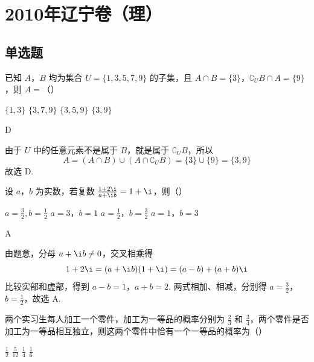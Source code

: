 \chapter{2010年辽宁卷（理）}

\section{单选题}

\begin{problem}
已知 \(A\)，\(B\) 均为集合 \(U = \{1, 3, 5, 7, 9\}\) 的子集，且 \(A \cap B = \{3\}\)，\(\complement_U B \cap A = \{9\}\)，则 \(A =\)（\quad）

\choices
    {\(\{1, 3\}\)}
    {\(\{3,7,9\}\)}
    {\(\{3,5,9\}\)}
    {\(\{3,9\}\)}
\end{problem}

\begin{answer}
D
\end{answer}

\begin{solution}
由于 \(U\) 中的任意元素不是属于 \(B\)，就是属于 \(\complement_U B\)，所以
\[
A=(A\cap B)\cup(A\cap\complement_U B)=\{3\}\cup\{9\}=\{3,9\}
\]
故选 D.
\end{solution}

\begin{problem}
设 \(a\)，\(b\) 为实数，若复数 \(\frac{1 + 2\i}{a + \i b} = 1 + \i\)，则（\quad）

\choices
    {\(a = \frac{3}{2}, b = \frac{1}{2}\)}
    {\(a = 3\)，\(b = 1\)}
    {\(a = \frac{1}{2}\)，\(b = \frac{3}{2}\)}
    {\(a = 1\)，\(b = 3\)}
\end{problem}

\begin{answer}
A
\end{answer}

\begin{solution}
由题意，分母 \(a+\i b\neq0\)，交叉相乘得
\[
1+2\i=(a+\i b)(1+\i)=(a-b)+(a+b)\i
\]
比较实部和虚部，得到 \(a-b=1\)，\(a+b=2\). 两式相加、相减，分别得 \(a=\frac{3}{2}\)，\(b=\frac{1}{2}\)，故选 A.
\end{solution}

\begin{problem}
两个实习生每人加工一个零件，加工为一等品的概率分别为 \(\frac{2}{3}\) 和 \(\frac{3}{4}\)，两个零件是否加工为一等品相互独立，则这两个零件中恰有一个一等品的概率为（\quad）

\choices
    {\( \frac{1}{2} \)}
    {\( \frac{5}{12} \)}
    {\( \frac{1}{4} \)}
    {\( \frac{1}{6} \)}
\end{problem}

